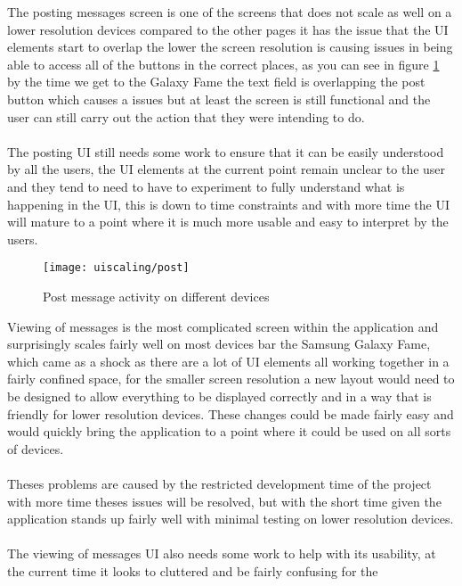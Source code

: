 \noindent
The posting messages screen is one of the screens that does not scale as well on a lower resolution devices compared to the other pages it has the issue that the UI elements start to overlap the lower the screen resolution is causing issues in being able to access all of the buttons in the correct places, as you can see in figure \ref{fig:ui_scaling_post_image} by the time we get to the Galaxy Fame the text field is overlapping the post button which causes a issues but at least the screen is still functional and the user can still carry out the action that they were intending to do.\\
\\
The posting UI still needs some work to ensure that it can be easily understood by all the users, the UI elements at the current point remain unclear to the user and they tend to need to have to experiment to fully understand what is happening in the UI, this is down to time constraints and with more time the UI will mature to a point where it is much more usable and easy to interpret by the users.

\begin{figure}[H]
    \centering
    \texttt{[image: uiscaling/post]}
    \caption{Post message activity on different devices}
    \label{fig:ui_scaling_post_image}
\end{figure} 

\noindent
Viewing of messages is the most complicated screen within the application and surprisingly scales fairly well on most devices bar the Samsung Galaxy Fame, which came as a shock as there are a lot of UI elements all working together in a fairly confined space, for the smaller screen resolution a new layout would need to be designed to allow everything to be displayed correctly and in a way that is friendly for lower resolution devices. These changes could be made fairly easy and would quickly bring the application to a point where it could be used on all sorts of devices.\\
\\
Theses problems are caused by the restricted development time of the project with more time theses issues will be resolved, but with the short time given the application stands up fairly well with minimal testing on lower resolution devices.\\
\\
The viewing of messages UI also needs some work to help with its usability, at the current time it looks to cluttered and be fairly confusing for the


